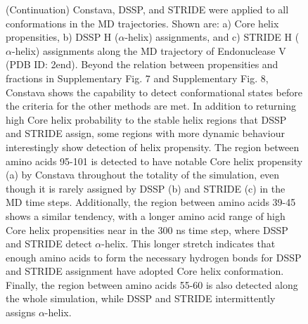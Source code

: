 \begin{figure}[H]
  \ContinuedFloat
  \caption[]{(Continuation) Constava, DSSP, and STRIDE were applied to all conformations in the MD trajectories. Shown are: a) Core helix propensities, b) DSSP H ($\alpha$-helix) assignments, and c) STRIDE H ($\alpha$-helix) assignments along the MD trajectory of Endonuclease V (PDB ID: 2end). Beyond the relation between propensities and fractions in Supplementary Fig. 7 and Supplementary Fig. 8, Constava shows the capability to detect conformational states before the criteria for the other methods are met. In addition to returning high Core helix probability to the stable helix regions that DSSP and STRIDE assign, some regions with more dynamic behaviour interestingly show detection of helix propensity. The region between amino acids 95-101 is detected to have notable Core helix propensity (a) by Constava throughout the totality of the simulation, even though it is rarely assigned by DSSP (b) and STRIDE (c) in the MD time steps. Additionally, the region between amino acids 39-45 shows a similar tendency, with a longer amino acid range of high Core helix propensities near in the 300 ns time step, where DSSP and STRIDE detect $\alpha$-helix. This longer stretch indicates that enough amino acids to form the necessary hydrogen bonds for DSSP and STRIDE assignment have adopted Core helix conformation. Finally, the region between amino acids 55-60 is also detected along the whole simulation, while DSSP and STRIDE intermittently assigns $\alpha$-helix.}
\end{figure}

